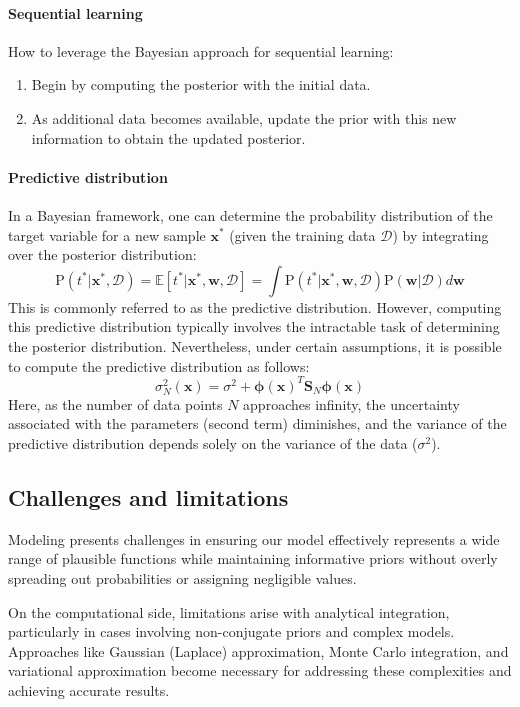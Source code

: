 \paragraph*{Sequential learning}
How to leverage the Bayesian approach for sequential learning:
\begin{enumerate}
    \item Begin by computing the posterior with the initial data.
    \item As additional data becomes available, update the prior with this new information to obtain the updated posterior.
\end{enumerate}

\paragraph*{Predictive distribution}
In a Bayesian framework, one can determine the probability distribution of the target variable for a new sample $\textbf{x}^\ast$ (given the training data $\mathcal{D}$) by integrating over the posterior distribution:
\[\text{P}(t^\ast|\textbf{x}^\ast,\mathcal{D})=\mathbb{E}\left[ t^\ast|\textbf{x}^\ast,\textbf{w},\mathcal{D} \right] = \int\text{P}(t^\ast|\textbf{x}^\ast,\textbf{w},\mathcal{D})\text{P}(\textbf{w}|\mathcal{D})d\textbf{w}\]
This is commonly referred to as the predictive distribution.
However, computing this predictive distribution typically involves the intractable task of determining the posterior distribution.
Nevertheless, under certain assumptions, it is possible to compute the predictive distribution as follows: 
\[\sigma_N^2(\textbf{x})=\sigma^2+\boldsymbol{\phi}{(\textbf{x})}^T\textbf{S}_N\boldsymbol{\phi}(\textbf{x})\]
Here, as the number of data points $N$ approaches infinity, the uncertainty associated with the parameters (second term) diminishes, and the variance of the predictive distribution depends solely on the variance of the data ($\sigma^2$). 

\subsection{Challenges and limitations}
Modeling presents challenges in ensuring our model effectively represents a wide range of plausible functions while maintaining informative priors without overly spreading out probabilities or assigning negligible values.

On the computational side, limitations arise with analytical integration, particularly in cases involving non-conjugate priors and complex models. 
Approaches like Gaussian (Laplace) approximation, Monte Carlo integration, and variational approximation become necessary for addressing these complexities and achieving accurate results.

